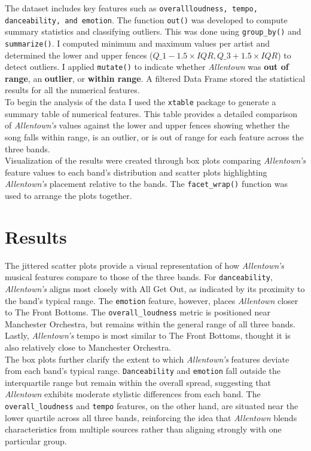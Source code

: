\documentclass{article}\usepackage[]{graphicx}\usepackage[]{xcolor}
\begin{document}
\begin{multicols}{2}
The dataset includes key features such as \texttt{overall\textunderscore loudness, tempo, danceability, and emotion}. The function \texttt{out()} was developed to compute summary statistics and classifying outliers. This was done using \texttt{group\_by()} and \texttt{summarize()}. I computed minimum and maximum values per artist and determined the lower and upper fences ($Q\_1 - 1.5 \times IQR, Q\_3 + 1.5 \times IQR$) to detect outliers. I applied \texttt{mutate()} to indicate whether \textit{Allentown} was \textbf{out of range}, an \textbf{outlier}, or \textbf{within range}. A filtered Data Frame stored the statistical results for all the numerical features.\\

\noindent To begin the analysis of the data I used the \texttt{xtable} \citep{xtab} package to generate a summary table of numerical features. This table provides a detailed comparison of \textit{Allentown's} values against the lower and upper fences showing whether the song falls within range, is an outlier, or is out of range for each feature across the three bands.\\

\noindent Visualization of the results were created through box plots comparing \textit{Allentown's} feature values to each band's distribution and scatter plots highlighting \textit{Allentown's} placement relative to the bands. The \texttt{facet\_wrap()} function was used to arrange the plots together.


\section{Results}

The jittered scatter plots provide a visual representation of how \textit{Allentown's} musical features compare to those of the three bands. For \texttt{danceability}, \textit{Allentown's} aligns most closely with All Get Out, as indicated by its proximity to the band's typical range. The \texttt{emotion} feature, however, places \textit{Allentown} closer to The Front Bottoms. The \texttt{overall\_loudness} metric is positioned near Manchester Orchestra, but remains within the general range of all three bands. Lastly, \textit{Allentown's} tempo is most similar to The Front Bottoms, thought it is also relatively close to Manchester Orchestra. \\

\noindent The box plots further clarify the extent to which \textit{Allentown's} features deviate from each band's typical range. \texttt{Danceability} and \texttt{emotion} fall outside the interquartile range but remain within the overall spread, suggesting that \textit{Allentown} exhibits moderate stylistic differences from each band. The \texttt{overall\_loudness} and \texttt{tempo} features, on the other hand, are situated near the lower quartile across all three bands, reinforcing the idea that \textit{Allentown} blends characteristics from multiple sources rather than aligning strongly with one particular group.\\


\end{multicols}
\end{document}

